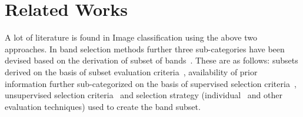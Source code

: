 \section{Related Works}
A lot of literature is found in Image classification using the above two approaches. In band selection methods further three sub-categories have been devised based on the derivation of subset of bands~\cite{sawant2020survey}. These are as follows: subsets derived on the basis of subset evaluation criteria~\cite{chang1999joint,tschannerl2019mimr,bhardwaj2018unsupervised,keshava2004distance,zhang2018fast}, availability of prior information further sub-categorized on the basis of supervised selection criteria~\cite{guo2014improving,yang2010efficient}, unsupervised selection criteria~\cite{sawant2020unsupervised,jia2012unsupervised} and selection strategy (individual~\cite{datta2015combination,jia2015novel} and other evaluation techniques) used to create the band subset.

